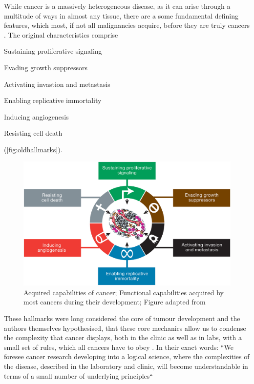 While cancer is a massively heterogeneous disease, as it can arise through a multitude of ways in almost any tissue, there are a some fundamental defining features, which most, if not all malignancies acquire, before they are truly cancers . The original characteristics comprise 
\begin{enumerate*}
	\item Sustaining proliferative signaling
	\item Evading growth suppressors
	\item Activating invastion and metastasis
	\item Enabling replicative immortality
	\item Inducing angiogenesis
	\item Resisting cell death
\end{enumerate*} (\autoref{fig:oldhallmarks}). 


\begin{figure}[!ht]
\centering
\includegraphics[width=.95\linewidth]{Figures/oldHallmarksCancer.jpg}
\caption[Original hallmarks of cancer]{Acquired capabilities of cancer; Functional capabilities acquired by most cancers during their development; Figure adapted from \protect\citeauthor*{Hanahan2000}\protect\cite{Hanahan2000}}\label{fig:oldhallmarks}
\end{figure}


These hallmarks were long considered the core of tumour development and the authors themselves hypothesised, that these core mechanics allow us to condense the complexity that cancer displays, both in the clinic as well as in labs, with a small set of rules, which all cancers have to obey \cite{Hanahan2000}. In their exact words: ``We foresee cancer research developing into a logical science, where the complexities of the disease, described in the laboratory and clinic, will become understandable in terms of a small number of underlying principles``


